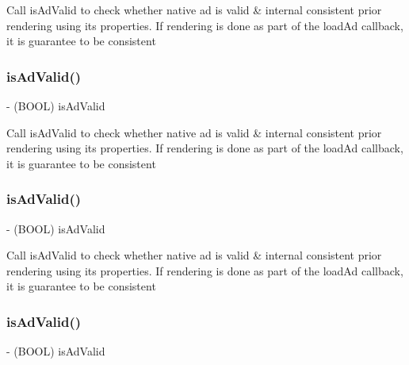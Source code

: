 Call is\+Ad\+Valid to check whether native ad is valid \& internal consistent prior rendering using its properties. If rendering is done as part of the load\+Ad callback, it is guarantee to be consistent \mbox{\label{interfaceFBNativeAd_ab7ac5c53be873134d4ad5082e542754d}} 
\subsubsection{\texorpdfstring{is\+Ad\+Valid()}{isAdValid()}\hspace{0.1cm}{\footnotesize\ttfamily [2/5]}}
{\footnotesize\ttfamily -\/ (B\+O\+OL) is\+Ad\+Valid \begin{DoxyParamCaption}{ }\end{DoxyParamCaption}}

Call is\+Ad\+Valid to check whether native ad is valid \& internal consistent prior rendering using its properties. If rendering is done as part of the load\+Ad callback, it is guarantee to be consistent \mbox{\label{interfaceFBNativeAd_ab7ac5c53be873134d4ad5082e542754d}} 
\subsubsection{\texorpdfstring{is\+Ad\+Valid()}{isAdValid()}\hspace{0.1cm}{\footnotesize\ttfamily [3/5]}}
{\footnotesize\ttfamily -\/ (B\+O\+OL) is\+Ad\+Valid \begin{DoxyParamCaption}{ }\end{DoxyParamCaption}}

Call is\+Ad\+Valid to check whether native ad is valid \& internal consistent prior rendering using its properties. If rendering is done as part of the load\+Ad callback, it is guarantee to be consistent \mbox{\label{interfaceFBNativeAd_ab7ac5c53be873134d4ad5082e542754d}} 
\subsubsection{\texorpdfstring{is\+Ad\+Valid()}{isAdValid()}\hspace{0.1cm}{\footnotesize\ttfamily [4/5]}}
{\footnotesize\ttfamily -\/ (B\+O\+OL) is\+Ad\+Valid \begin{DoxyParamCaption}{ }\end{DoxyParamCaption}}

